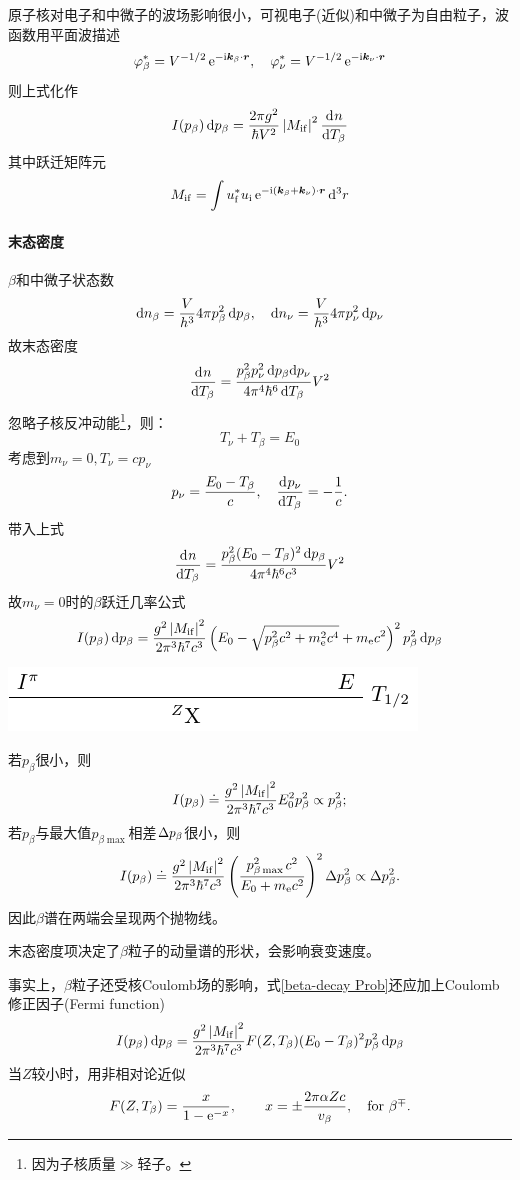 原子核对电子和中微子的波场影响很小，可视电子(近似)和中微子为自由粒子，波函数用平面波描述
\[
	\varphi_\beta^\ast=V^{-1/2}\mathop{}\!\mathrm{e}^{-\mathrm{i}\bm k_\beta\cdot\bm r},\quad\varphi_\nu^\ast=V^{-1/2}\mathop{}\!\mathrm{e}^{-\mathrm{i}\bm k_\nu\cdot\bm r}
\]
则上式化作
\[
	I(p_\beta)\mathop{}\!\mathrm{d} p_\beta=\frac{2\pi g^2}{\hbar V^2}\left\lvert M_{\mathrm{i}\mathrm{f}}\right\rvert^2\frac{\mathrm{d}^{{}}n}{\mathrm{d}{T_\beta}^{{}}}
\]
其中跃迁矩阵元
\begin{align}\label{transition matrix element}
	M_{\mathrm{i}\mathrm{f}}=\int u_{\mathrm{f}}^\ast u_{\mathrm{i}}\mathop{}\!\mathrm{e}^{-\mathrm{i}(\bm k_\beta+\bm k_\nu)\cdot\bm r}\mathop{}\!\mathrm{d}^3r
\end{align}

\paragraph{末态密度}$\beta$和中微子状态数
\[
	\mathop{}\!\mathrm{d} n_\beta=\frac V{h^3}4\pi p_\beta^2\mathop{}\!\mathrm{d} p_\beta,\quad \mathop{}\!\mathrm{d} n_\nu=\frac V{h^3}4\pi p_\nu^2\mathop{}\!\mathrm{d} p_\nu
\]
故末态密度
\[
	\frac{\mathrm{d}^{{}}n}{\mathrm{d}{T_\beta}^{{}}}=\frac{p_\beta^2p_\nu^2\mathop{}\!\mathrm{d} p_\beta\mathrm{d} p_\nu}{4\pi^4\hbar^6\mathop{}\!\mathrm{d} T_\beta}V^2
\]
忽略子核反冲动能\footnote{因为子核质量$\gg$轻子。}，则：
\[
	T_\nu+T_\beta=E_0
\]
考虑到$m_\nu=0,T_\nu=cp_\nu$
\[
	p_\nu=\frac{E_0-T_\beta}c,\quad\frac{\mathrm{d}^{{}}p_\nu}{\mathrm{d}{T_\beta}^{{}}}=-\frac1c.
\]
带入上式
\[
	\frac{\mathrm{d}^{{}}n}{\mathrm{d}{T_\beta}^{{}}}=\frac{p_\beta^2(E_0-T_\beta)^2\mathop{}\!\mathrm{d} p_\beta}{4\pi^4\hbar^6c^3}V^2
\]
故$m_\nu=0$时的$\beta$跃迁几率公式
\begin{align}\label{beta-decay Prob}
	I(p_\beta)\mathop{}\!\mathrm{d} p_\beta=\frac{g^2\left\lvert M_{\mathrm{i}\mathrm{f}}\right\rvert^2}{2\pi^3\hbar^7c^3}\left(E_0-\sqrt{p_\beta^2c^2+m_\mathrm e^2c^4}+m_\mathrm e c^2\right)^2p_\beta^2\mathop{}\!\mathrm{d} p_\beta
\end{align}
\begin{center}
	\includegraphics[page=7]{figures/tikz/layouts.pdf}
\end{center}
若$p_\beta$很小，则
\[
	I(p_\beta)\doteq\frac{g^2\left\lvert M_{\mathrm{i}\mathrm{f}}\right\rvert^2}{2\pi^3\hbar^7c^3}E_0^2p_\beta^2\propto p_\beta^2;
\]
若$p_\beta$与最大值$p_{\beta\max{}}$相差$\Delta p_\beta$很小，则
\[
	I(p_\beta)\doteq\frac{g^2\left\lvert M_{\mathrm{i}\mathrm{f}}\right\rvert^2}{2\pi^3\hbar^7c^3}\left(\frac{p_{\beta\max{}}^2c^2}{E_0+m_\mathrm e c^2}\right)^2\Delta p_\beta^2\propto\Delta p_\beta^2.
\]
因此$\beta$谱在两端会呈现两个抛物线。

末态密度项决定了$\beta$粒子的动量谱的形状，会影响衰变速度。

事实上，$\beta$粒子还受核Coulomb场的影响，式\eqref{beta-decay Prob}还应加上Coulomb修正因子(Fermi function)
\begin{align}\label{Fermi funtion}
	I(p_\beta)\mathop{}\!\mathrm{d} p_\beta=\frac{g^2\left\lvert M_{\mathrm{i}\mathrm{f}}\right\rvert^2}{2\pi^3\hbar^7c^3}F(Z,T_\beta)(E_0-T_\beta)^2p_\beta^2\mathop{}\!\mathrm{d} p_\beta
\end{align}
当$Z$较小时，用非相对论近似
\[
	F(Z,T_\beta)=\frac x{1-\mathop{}\!\mathrm{e}^{-x}},\qquad x=\pm\frac{2\pi\alpha Zc}{v_\beta},\quad\text{for}~\beta^\mp.
\]
